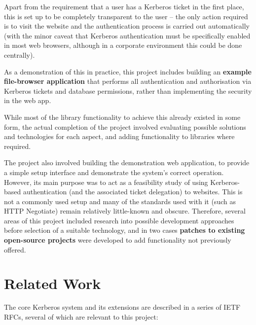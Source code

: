\documentclass[12pt]{report}
\begin{document}
Apart from the requirement that a user has a Kerberos ticket in the first place, this is set up to be completely transparent to the user -- the only action required is to visit the website and the authentication process is carried out automatically (with the minor caveat that Kerberos authentication must be specifically enabled in most web browsers, although in a corporate environment this could be done centrally).

As a demonstration of this in practice, this project includes building an \textbf{example file-browser application} that performs all authentication and authorisation via Kerberos tickets and database permissions, rather than implementing the security in the web app.

While most of the library functionality to achieve this already existed in some form, the actual completion of the project involved evaluating possible solutions and technologies for each aspect, and adding functionality to libraries where required.

The project also involved building the demonstration web application, to provide a simple setup interface and demonstrate the system's correct operation. However, its main purpose was to act as a feasibility study of using Kerberos-based authentication (and the associated ticket delegation) to websites. This is not a commonly used setup and many of the standards used with it (such as HTTP Negotiate) remain relatively little-known and obscure. Therefore, several areas of this project included research into possible development approaches before selection of a suitable technology, and in two cases \textbf{patches to existing open-source projects} were developed to add functionality not previously offered.

\section{Related Work}
The core Kerberos system and its extensions are described in a series of IETF RFCs, several of which are relevant to this project:
\end{document}
